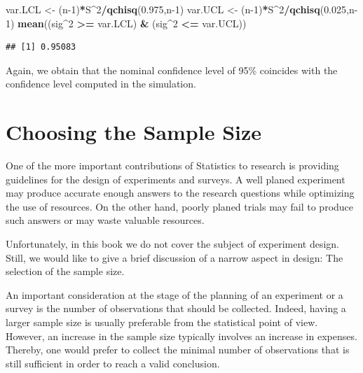 \documentclass[]{krantz}
\makeatletter
\newenvironment{Shaded}{\begin{snugshade}}{\end{snugshade}}
\newcommand{\DecValTok}[1]{\textcolor[rgb]{0.00,0.00,0.81}{#1}}
\newcommand{\FloatTok}[1]{\textcolor[rgb]{0.00,0.00,0.81}{#1}}
\newcommand{\KeywordTok}[1]{\textcolor[rgb]{0.13,0.29,0.53}{\textbf{#1}}}
\newcommand{\NormalTok}[1]{#1}
\newcommand{\OperatorTok}[1]{\textcolor[rgb]{0.81,0.36,0.00}{\textbf{#1}}}
\newcommand{\StringTok}[1]{\textcolor[rgb]{0.31,0.60,0.02}{#1}}
\newenvironment{kframe}{%
\medskip{}
\setlength{\fboxsep}{.8em}
 \def\at@end@of@kframe{}%
 \ifinner\ifhmode%
  \def\at@end@of@kframe{\end{minipage}}%
  \begin{minipage}{\columnwidth}%
 \fi\fi%
 \def\FrameCommand##1{\hskip\@totalleftmargin \hskip-\fboxsep
 \colorbox{shadecolor}{##1}\hskip-\fboxsep
     \hskip-\linewidth \hskip-\@totalleftmargin \hskip\columnwidth}%
 \MakeFramed {\advance\hsize-\width
   \@totalleftmargin\z@ \linewidth\hsize
   \@setminipage}}%
 {\par\unskip\endMakeFramed%
 \at@end@of@kframe}
\renewenvironment{Shaded}{\begin{kframe}}{\end{kframe}}
\theoremstyle{definition}
\theoremstyle{definition}
\theoremstyle{definition}
\theoremstyle{remark}
\makeatother
\begin{document}
\begin{Shaded}
\begin{Highlighting}[]
\NormalTok{var.LCL <-}\StringTok{ }\NormalTok{(n}\DecValTok{-1}\NormalTok{)}\OperatorTok{*}\NormalTok{S}\OperatorTok{^}\DecValTok{2}\OperatorTok{/}\KeywordTok{qchisq}\NormalTok{(}\FloatTok{0.975}\NormalTok{,n}\DecValTok{-1}\NormalTok{)}
\NormalTok{var.UCL <-}\StringTok{ }\NormalTok{(n}\DecValTok{-1}\NormalTok{)}\OperatorTok{*}\NormalTok{S}\OperatorTok{^}\DecValTok{2}\OperatorTok{/}\KeywordTok{qchisq}\NormalTok{(}\FloatTok{0.025}\NormalTok{,n}\DecValTok{-1}\NormalTok{)}
\KeywordTok{mean}\NormalTok{((sig}\OperatorTok{^}\DecValTok{2} \OperatorTok{>=}\StringTok{ }\NormalTok{var.LCL) }\OperatorTok{&}\StringTok{ }\NormalTok{(sig}\OperatorTok{^}\DecValTok{2} \OperatorTok{<=}\StringTok{ }\NormalTok{var.UCL))}
\end{Highlighting}
\end{Shaded}

\begin{verbatim}
## [1] 0.95083
\end{verbatim}

Again, we obtain that the nominal confidence level of 95\% coincides with
the confidence level computed in the simulation.

\hypertarget{choosing-the-sample-size}{%
\section{Choosing the Sample Size}\label{choosing-the-sample-size}}

One of the more important contributions of Statistics to research is
providing guidelines for the design of experiments and surveys. A well
planed experiment may produce accurate enough answers to the research
questions while optimizing the use of resources. On the other hand,
poorly planed trials may fail to produce such answers or may waste
valuable resources.

Unfortunately, in this book we do not cover the subject of experiment
design. Still, we would like to give a brief discussion of a narrow
aspect in design: The selection of the sample size.

An important consideration at the stage of the planning of an experiment
or a survey is the number of observations that should be collected.
Indeed, having a larger sample size is usually preferable from the
statistical point of view. However, an increase in the sample size
typically involves an increase in expenses. Thereby, one would prefer to
collect the minimal number of observations that is still sufficient in
order to reach a valid conclusion.
\end{document}
